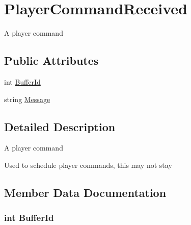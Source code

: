 \hypertarget{structOTA_1_1Callbacks_1_1PlayerCommandReceived}{}\section{Player\+Command\+Received}
\label{structOTA_1_1Callbacks_1_1PlayerCommandReceived}


A player command  


\subsection*{Public Attributes}
\begin{DoxyCompactItemize}
\item 
int \hyperlink{structOTA_1_1Callbacks_1_1PlayerCommandReceived_a40875775d70fb4be60823b9834f4ea82}{Buffer\+Id}
\item 
string \hyperlink{structOTA_1_1Callbacks_1_1PlayerCommandReceived_a40e8debace0cc6f4f7baa0fdd309c103}{Message}
\end{DoxyCompactItemize}


\subsection{Detailed Description}
A player command 

Used to schedule player commands, this may not stay

\subsection{Member Data Documentation}
\hypertarget{structOTA_1_1Callbacks_1_1PlayerCommandReceived_a40875775d70fb4be60823b9834f4ea82}{}
\subsubsection[{Buffer\+Id}]{\setlength{\rightskip}{0pt plus 5cm}int Buffer\+Id}\label{structOTA_1_1Callbacks_1_1PlayerCommandReceived_a40875775d70fb4be60823b9834f4ea82}
\hypertarget{structOTA_1_1Callbacks_1_1PlayerCommandReceived_a40e8debace0cc6f4f7baa0fdd309c103}{}
